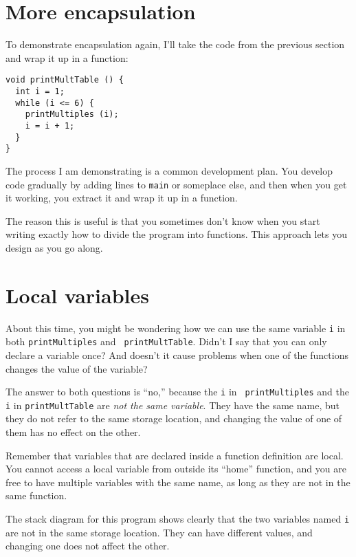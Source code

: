 \section{More encapsulation}

To demonstrate encapsulation again, I'll take the code
from the previous section and wrap it up in a function:

\begin{lstlisting}
void printMultTable () {
  int i = 1;
  while (i <= 6) {
    printMultiples (i);
    i = i + 1;
  }
}
\end{lstlisting}
%
The process I am demonstrating is a common 
development plan.  You develop code gradually by adding
lines to {\tt main} or someplace else, and then when you get
it working, you extract it and wrap it up in a function.

The reason this is useful is that you sometimes don't know
when you start writing exactly how to divide the program into
functions.  This approach lets you design as you go along.

\section{Local variables}

About this time, you might be wondering how we can use the same
variable {\tt i} in both {\tt printMultiples} and {\tt
printMultTable}.  Didn't I say that you can only declare a variable
once?  And doesn't it cause problems when one of the functions changes
the value of the variable?

The answer to both questions is ``no,'' because the {\tt i} in {\tt
printMultiples} and the {\tt i} in {\tt printMultTable} are
{\em not the same variable}.  They have the same name, but
they do not refer to the same storage location, and changing
the value of one of them has no effect on the other.


Remember that variables that are declared inside a function definition
are local.  You cannot access a local variable from outside its
``home'' function, and you are free to have multiple variables with
the same name, as long as they are not in the same function.

The stack diagram for this program shows clearly that the
two variables named {\tt i} are not in the same storage location.
They can have different values, and changing one does not affect
the other.

